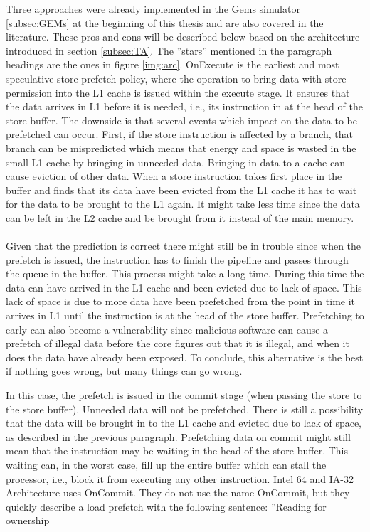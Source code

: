 Three approaches were already implemented in the Gems simulator \ref{subsec:GEMs} at the beginning of this thesis and are also covered in the literature. These pros and cons will
be described below based on the architecture introduced in section \ref{subsec:TA}. The ”stars”
mentioned in the paragraph headings are the ones in figure \ref{img:arc}.
  OnExecute \cite{ONEX} is the earliest and most speculative store
prefetch policy, where the operation to bring data with store permission into the
L1 cache is issued within the execute stage. It ensures that the data arrives in L1
before it is needed, i.e., its instruction in at the head of the store buffer. The downside
is that several events which impact on the data to be prefetched can occur. First, if
the store instruction is affected by a branch, that branch can be mispredicted which
means that energy and space is wasted in the small L1 cache by bringing in unneeded
data. Bringing in data to a cache can cause eviction of other data. When a store
instruction takes first place in the buffer and finds that its data have been evicted
from the L1 cache it has to wait for the data to be brought to the L1 again. It might
take less time since the data can be left in the L2 cache and be brought from it instead
of the main memory.
\\ \\
Given that the prediction is correct there might still be in trouble since when the
prefetch is issued, the instruction has to finish the pipeline and passes through the queue in the buffer. This process might
take a long time. During this time the data can have arrived in the L1 cache and been
evicted due to lack of space. This lack of space is due to more data have been prefetched from the point in
time it arrives in L1 until the instruction is at the head of the store buffer. Prefetching to early
can also become a vulnerability since malicious software can cause a prefetch of illegal data
before the core figures out that it is illegal, and when it does the data have already
been exposed. To conclude, this alternative is the best if nothing goes wrong, but
many things can go wrong.

 In this case, the prefetch is issued in the commit stage (when passing
the store to the store buffer). Unneeded data will not be
prefetched. There is still a possibility that the data will be brought in to the L1 cache and evicted
due to lack of space, as described in the previous paragraph. Prefetching
data on commit might still mean that the instruction may be waiting in the head
of the store buffer. This waiting can, in the worst case, fill up the entire buffer which can stall the
processor, i.e., block it from executing any other instruction. Intel 64 and IA-32 Architecture \cite{ONCO} uses OnCommit. They do not use the name OnCommit, but they
quickly describe a load prefetch with the following sentence: ”Reading for ownership

